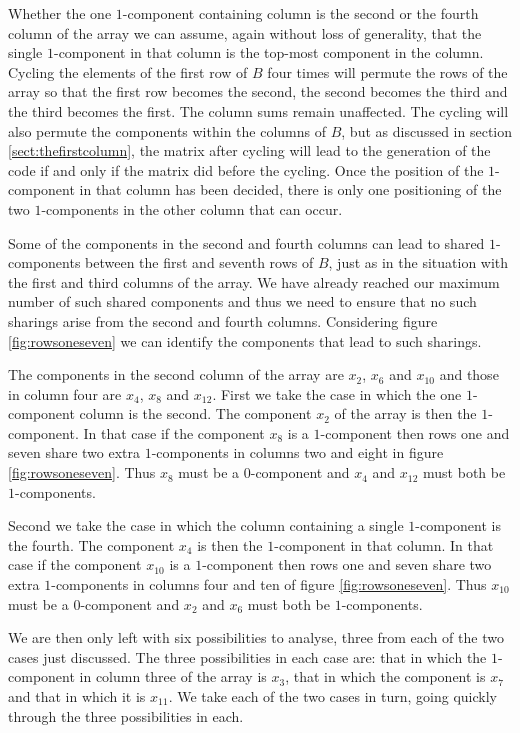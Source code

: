 Whether the one $1$-component containing column is the second or the fourth column of the array we can assume, again without loss of generality, that the single $1$-component in that column is the top-most component in the column.
Cycling the elements of the first row of $B$ four times will permute the rows of the array so that the first row becomes the second, the second becomes the third and the third becomes the first.
The column sums remain unaffected.
The cycling will also permute the components within the columns of $B$, but as discussed in section \ref{sect:thefirstcolumn}, the matrix after cycling will lead to the generation of the code if and only if the matrix did before the cycling.
Once the position of the $1$-component in that column has been decided, there is only one positioning of the two $1$-components in the other column that can occur.

Some of the components in the second and fourth columns can lead to shared $1$-components between the first and seventh rows of $B$, just as in the situation with the first and third columns of the array.
We have already reached our maximum number of such shared components and thus we need to ensure that no such sharings arise from the second and fourth columns.
Considering figure \ref{fig:rowsoneseven} we can identify the components that lead to such sharings.

The components in the second column of the array are $x_2$, $x_6$  and $x_{10}$ and those in column four are $x_4$, $x_8$ and $x_{12}$.
First we take the case in which the one $1$-component column is the second.
The component $x_2$ of the array is then the $1$-component.
In that case if the component $x_8$ is a $1$-component then rows one and seven share two extra $1$-components in columns two and eight in figure \ref{fig:rowsoneseven}.
Thus $x_8$ must be a $0$-component and $x_4$ and $x_{12}$ must both be $1$-components.

Second we take the case in which the column containing a single $1$-component is the fourth.
The component $x_4$ is then the $1$-component in that column.
In that case if the component $x_{10}$ is a $1$-component then rows one and seven share two extra $1$-components in columns four and ten of figure \ref{fig:rowsoneseven}.
Thus $x_{10}$ must be a $0$-component and $x_2$ and $x_6$ must both be $1$-components.

We are then only left with six possibilities to analyse, three from each of the two cases just discussed.
The three possibilities in each case are: that in which the $1$-component in column three of the array is $x_3$, that in which the component is $x_7$ and that in which it is $x_{11}$.
We take each of the two cases in turn, going quickly through the three possibilities in each.

